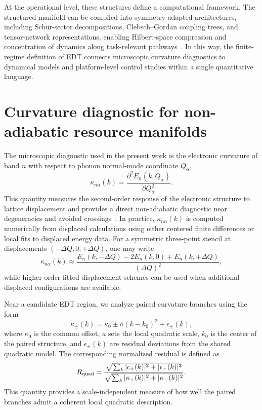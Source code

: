 \documentclass[twocolumn,10pt]{article}
\begin{document}
At the operational level, these structures define a computational framework. The structured manifold can be compiled into symmetry-adapted architectures, including Schur-sector decompositions, Clebsch--Gordan coupling trees, and tensor-network representations, enabling Hilbert-space compression and concentration of dynamics along task-relevant pathways~\cite{Bacon2006}. In this way, the finite-regime definition of EDT connects microscopic curvature diagnostics to dynamical models and platform-level control studies within a single quantitative language.


\section{Curvature diagnostic for non-adiabatic resource manifolds}

The microscopic diagnostic used in the present work is the electronic curvature of band $n$ with respect to phonon normal-mode coordinate $Q_\alpha$,
\begin{equation}
\kappa_{n\alpha}(k)=\frac{\partial^2 E_n(k,Q_\alpha)}{\partial Q_\alpha^2}.
\end{equation}
This quantity measures the second-order response of the electronic structure to lattice displacement and provides a direct non-adiabatic diagnostic near degeneracies and avoided crossings~\cite{Mead1979,Yarkony1996,Giustino2017}. In practice, $\kappa_{n\alpha}(k)$ is computed numerically from displaced calculations using either centered finite differences or local fits to displaced energy data. For a symmetric three-point stencil at displacements $(-\Delta Q,0,+\Delta Q)$, one may write
\begin{equation}
\kappa_{n\alpha}(k)\approx
\frac{E_n(k,-\Delta Q)-2E_n(k,0)+E_n(k,+\Delta Q)}{(\Delta Q)^2},
\end{equation}
while higher-order fitted-displacement schemes can be used when additional displaced configurations are available.

Near a candidate EDT region, we analyze paired curvature branches using the form
\begin{equation}
\kappa_\pm(k)
=
\kappa_0
\pm a(k-k_0)^2
+
\epsilon_\pm(k),
\end{equation}
where $\kappa_0$ is the common offset, $a$ sets the local quadratic scale, $k_0$ is the center of the paired structure, and $\epsilon_\pm(k)$ are residual deviations from the shared quadratic model. The corresponding normalized residual is defined as
\begin{equation}
R_{\rm quad}
=
\frac{
\sqrt{\sum_k |\epsilon_+(k)|^2 + |\epsilon_-(k)|^2}
}{
\sqrt{\sum_k |\kappa_+(k)|^2 + |\kappa_-(k)|^2}
}.
\end{equation}
This quantity provides a scale-independent measure of how well the paired branches admit a coherent local quadratic description.
\end{document}
